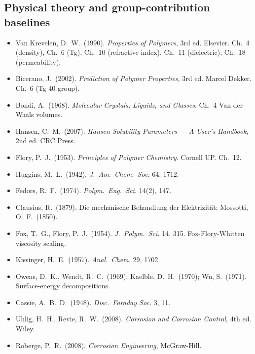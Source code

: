 \documentclass[10pt,a4paper]{article}
\begin{document}
\subsection*{Physical theory and group-contribution baselines}
\begin{itemize}\footnotesize
\item Van Krevelen, D.\ W.\ (1990). \emph{Properties of Polymers}, 3rd ed. Elsevier. Ch.~4 (density), Ch.~6 (Tg), Ch.~10 (refractive index), Ch.~11 (dielectric), Ch.~18 (permeability).
\item Bicerano, J.\ (2002). \emph{Prediction of Polymer Properties}, 3rd ed. Marcel Dekker. Ch.~6 (Tg 40-group).
\item Bondi, A.\ (1968). \emph{Molecular Crystals, Liquids, and Glasses}. Ch.~4 Van der Waals volumes.
\item Hansen, C.\ M.\ (2007). \emph{Hansen Solubility Parameters --- A User's Handbook}, 2nd ed. CRC Press.
\item Flory, P.\ J.\ (1953). \emph{Principles of Polymer Chemistry}. Cornell UP. Ch.~12.
\item Huggins, M.\ L.\ (1942). \emph{J.\ Am.\ Chem.\ Soc.} 64, 1712.
\item Fedors, R.\ F.\ (1974). \emph{Polym.\ Eng.\ Sci.} 14(2), 147.
\item Clausius, R.\ (1879). Die mechanische Behandlung der Elektrizität; Mossotti, O.\ F.\ (1850).
\item Fox, T.\ G., Flory, P.\ J.\ (1954). \emph{J.\ Polym.\ Sci.} 14, 315. Fox-Flory-Whitten viscosity scaling.
\item Kissinger, H.\ E.\ (1957). \emph{Anal.\ Chem.} 29, 1702.
\item Owens, D.\ K., Wendt, R.\ C.\ (1969); Kaelble, D.\ H.\ (1970); Wu, S.\ (1971). Surface-energy decompositions.
\item Cassie, A.\ B.\ D.\ (1948). \emph{Disc.\ Faraday Soc.} 3, 11.
\item Uhlig, H.\ H., Revie, R.\ W.\ (2008). \emph{Corrosion and Corrosion Control}, 4th ed. Wiley.
\item Roberge, P.\ R.\ (2008). \emph{Corrosion Engineering}, McGraw-Hill.
\end{itemize}
\end{document}
